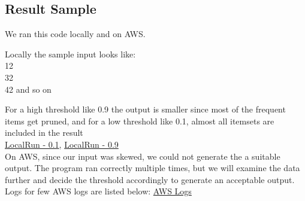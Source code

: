 \documentclass[11pt]{article}
\begin{document}
\subsection {Result Sample}

We ran this code locally and on AWS.

Locally the sample input looks like:\\
1\hspace{1cm}2\\
3\hspace{1cm}2\\
4\hspace{1cm}2 and so on

For a high threshold like 0.9 the output is smaller since most of the frequent items get pruned, and for a low threshold like 0.1, almost all itemsets are included in the result\\
\href{https://github.ccs.neu.edu/prdx/CS6240-Project/tree/master/localLogs/sp_0.1}{LocalRun - 0.1},
\href{https://github.ccs.neu.edu/prdx/CS6240-Project/tree/master/localLogs/3}{LocalRun - 0.9}\\

On AWS, since our input was skewed, we could not generate the a suitable output. The program ran correctly multiple times, but we will examine the data further and decide the threshold accordingly to generate an acceptable output. Logs for few AWS logs are listed below:
\href{https://github.ccs.neu.edu/prdx/CS6240-Project/tree/master/awsLogsOutput-1}{AWS Logs}
\end{document}
